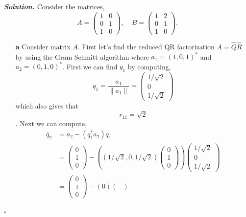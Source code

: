\documentclass[12pt]{report}
\newenvironment{solution}[1][\it{Solution}]{\textbf{#1. } }{$\square$}
\begin{document}
\begin{solution}
    \noindent
    Consider the matrices,
    \[
        A = \begin{pmatrix}
            1&0\\0&1\\1&0
        \end{pmatrix}, ~~~~~ B = \begin{pmatrix}
            1&2\\0&1\\1&0
        \end{pmatrix}.
    \]

    \begin{enumerate}
        \item [{\bf a}] Consider matrix $A$. First let's find the reduced QR factorization $A = \hat{Q}\hat{R}$ by using the Gram Schmitt algorithm where $a_1 = (1,0,1)^*$ and $a_2 = (0,1,0)^*$. First we can find $q_1$ by computing,
        \[
            q_1 = \frac{a_1}{\|a_1\|} = \begin{pmatrix}
                1/\sqrt{2}\\0\\1/\sqrt{2}
            \end{pmatrix}
        \]
        which also gives that \[r_{11} = \sqrt{2}\].
        Next we can compute,
        \begin{align*}
            \tilde{q_2} &= a_2 - (q_1^*a_2)q_1\\
            &= \begin{pmatrix}
                0\\1\\0
            \end{pmatrix} - \left( (1/\sqrt{2}, 0, 1/\sqrt{2}) \begin{pmatrix}
                0\\1\\0
            \end{pmatrix}\right)\begin{pmatrix}
                1/\sqrt{2}\\0\\1/\sqrt{2}
            \end{pmatrix}\\
            &= \begin{pmatrix}
                0\\1\\0
            \end{pmatrix} - \left( 0 \right)\begin{pmatrix}

\end{pmatrix}
\end{align*}
\end{enumerate}
\end{solution}
\end{document}
